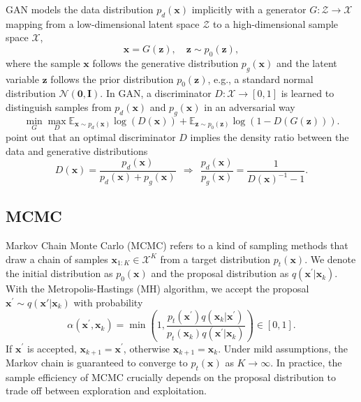 \documentclass{article} %
\newcommand{\bx}{\mathbf{x}}
\newcommand{\bz}{\mathbf{z}}
\newcommand{\bI}{\mathbf{I}}
\newcommand{\cN}{\mathcal{N}}
\newcommand{\cX}{\mathcal{X}}
\newcommand{\cZ}{\mathcal{Z}}
\newcommand{\bbE}{\mathbb{E}}
\newcommand{\bbR}{\mathbb{R}}
\newcommand{\bzero}{\mathbf{0}}
\newcommand{\<}{\left\langle}
\renewcommand{\>}{\right\rangle}
\begin{document}
GAN models the data distribution $p_d(\bx)$ implicitly with a generator $G: \cZ\to\cX$ mapping from a low-dimensional latent space $\cZ$ to a high-dimensional sample space $\cX$,
\begin{equation}
    \bx=G(\bz), \quad \bz\sim p_0(\bz),
\end{equation}
where the sample $\bx$ follows the generative distribution $p_g(\bx)$ and the latent variable $\bz$ follows the prior distribution $p_0(\bz)$, e.g., a standard normal distribution $\cN(\bzero,\bI)$. In GAN, a discriminator  $D:\cX\to[0,1]$ is learned to distinguish samples from $p_d(\bx)$ and $p_g(\bx)$ in an adversarial way
\begin{equation}
    \min_G\max_D\bbE_{\bx\sim p_d(\bx)}\log(D(\bx))+\bbE_{\bz\sim p_0(\bz)}\log(1-D(G(\bz))).
\end{equation}
\cite{goodfellow2014generative} point out that an optimal discriminator $D$ implies the density ratio between the data and generative distributions 
\begin{equation}
D(\mathbf{x})=\frac{p_{d}(\mathbf{x})}{p_{d}(\mathbf{x})+p_{g}(\mathbf{x})} ~~\Rightarrow ~~ \frac{p_d(\bx)}{p_g(\bx)}=\frac{1}{D(\bx)^{-1}-1}.
\label{eq:optimal-D}
\end{equation}

\subsection{MCMC}
\label{sec:mcmc}
Markov Chain Monte Carlo (MCMC) refers to a kind of sampling methods that draw a chain of samples $\bx_{1:K}\in\cX^K$ from a target distribution $p_t(\bx)$. We denote the initial distribution as $p_0(\bx)$ and the proposal distribution as $q(\bx^\prime|\bx_k)$. With the Metropolis-Hastings (MH) algorithm, we accept the proposal $\bx^\prime\sim q(\bx'|\bx_k)$ with probability
\begin{equation}
\alpha\left(\mathbf{x}^{\prime}, \mathbf{x}_{k}\right)=\min \left(1, \frac{p_t\left(\mathbf{x}^{\prime}\right) q\left(\mathbf{x}_{k}|\bx^\prime\right)}{p_t\left(\mathbf{x}_{k}\right) q\left(\mathbf{x}^{\prime}|\bx_k\right)}\right) \in[0,1].   
\label{eq:mh-accept} 
\end{equation}
If $\bx^{\prime}$ is accepted, $\bx_{k+1}=\bx^{\prime}$, otherwise $\bx_{k+1}=\bx_{k}$. Under mild assumptions, the Markov chain is guaranteed to converge to $p_t(\bx)$ as $K\to\infty$. In practice, the sample efficiency of MCMC crucially depends on the proposal distribution to trade off between exploration and exploitation. 
\end{document}

